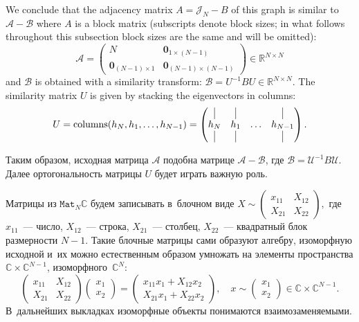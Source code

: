 \documentclass[14pt,a4paper]{extarticle}
\theoremstyle{definition}
\begin{document}
We conclude that the adjacency matrix \( A = \mathcal{J}_N - B \) of this graph
    is similar to \( \mathcal{A} - \mathcal{B} \)
    where \( A \) is a block matrix (subscripts denote block sizes; in what follows throughout this subsection block sizes are the same and will be omitted):
    \[
        \mathcal{A} = \left(\begin{array}{c|c}
        N & \mathbf{0}_{1{\times}(N{-}1)} \\ \hline
            \mathbf{0}_{(N{-}1){\times}1} & \mathbf{0}_{(N{-}1){\times}(N{-}1)}
        \end{array}\right) \in \mathbb{R}^{N{\times}N}
    \]
    and \( \mathcal{B} \) is obtained with a similarity transform:
    \(
        \mathcal{B} = U^{-1} B U \in \mathbb{R}^{N{\times}N}.
    \)
The similarity matrix \( U \) is given by stacking the eigenvectors in columns:
    \[
        U = \operatorname{columns}(h_N, h_1, \ldots, h_{N-1}) =
        \begin{pmatrix}
            \vline & \vline &        & \vline \\
            h_N    & h_1    & \ldots & h_{N-1} \\
            \vline & \vline &        & \vline

        \end{pmatrix}.
    \]


Таким образом, исходная матрица \( \mathcal{A} \) подобна матрице
\( \mathcal{A} - \mathcal{B} \), где \( \mathcal{B} = \mathcal{U}^{-1} B \mathcal{U} \).
Далее ортогональность матрицы \( U \) будет играть важную роль.

Матрицы из \( \mathtt{Mat}_N\mathbb{C} \) будем записывать в~блочном виде
\( X \sim
    \begin{pmatrix}
    x_{11} & X_{12} \\
    X_{21} & X_{22}
    \end{pmatrix}, \)
    где \( x_{11} \)~--- число,
    \( X_{12} \)~--- строка, \( X_{21} \)~--- столбец,
    \( X_{22} \)~--- квадратный блок размерности \( N-1 \).
Такие блочные матрицы сами образуют алгебру, изоморфную исходной
и~их можно естественным образом умножать
на элементы пространства \( \mathbb{C}\times\mathbb{C}^{N-1} \),
изоморфного~\( \mathbb{C}^N \):
\[
    \begin{pmatrix}
    x_{11} & X_{12} \\
    X_{21} & X_{22}
    \end{pmatrix}
    \begin{pmatrix} x_1 \\ x_2 \end{pmatrix}
  = \begin{pmatrix}
      x_{11} x_1 + X_{12} x_2 \\
      X_{21} x_1 + X_{22} x_2
      \end{pmatrix},\quad x \sim \begin{pmatrix} x_1 \\ x_2 \end{pmatrix}\in \mathbb{C}\times\mathbb{C}^{N-1}.
    \]
В~дальнейших выкладках изоморфные объекты понимаются взаимозаменяемыми.
\end{document}

